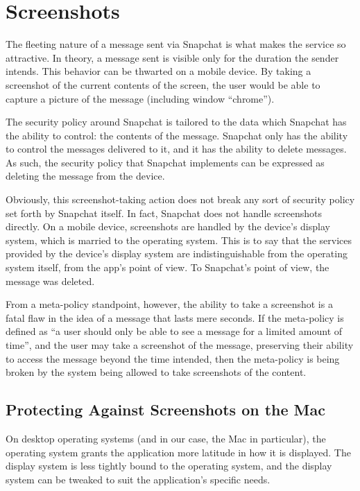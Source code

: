 \documentclass[11pt, a4paper,titlepage]{report}
\begin{document}
\section{Screenshots}
The fleeting nature of a message sent via Snapchat is what makes the service so attractive. In theory, a message sent is visible only for the duration the sender intends. This behavior can be thwarted on a mobile device. By taking a screenshot of the current contents of the screen, the user would be able to capture a picture of the message (including window ``chrome'').

The security policy around Snapchat is tailored to the data which Snapchat has the ability to control: the contents of the message. Snapchat only has the ability to control the messages delivered to it, and it has the ability to delete messages. As such, the security policy that Snapchat implements can be expressed as deleting the message from the device.

Obviously, this screenshot-taking action does not break any sort of security policy set forth by Snapchat itself. In fact, Snapchat does not handle screenshots directly. On a mobile device, screenshots are handled by the device's display system, which is married to the operating system. This is to say that the services provided by the device's display system are indistinguishable from the operating system itself, from the app's point of view. To Snapchat's point of view, the message was deleted.

From a meta-policy standpoint, however, the ability to take a screenshot is a fatal flaw in the idea of a message that lasts mere seconds. If the meta-policy is defined as ``a user should only be able to see a message for a limited amount of time'', and the user may take a screenshot of the message, preserving their ability to access the message beyond the time intended, then the meta-policy is being broken by the system being allowed to take screenshots of the content.

\subsection*{Protecting Against Screenshots on the Mac}
On desktop operating systems (and in our case, the Mac in particular), the operating system grants the application more latitude in how it is displayed. The display system is less tightly bound to the operating system, and the display system can be tweaked to suit the application's specific needs.
\end{document}
